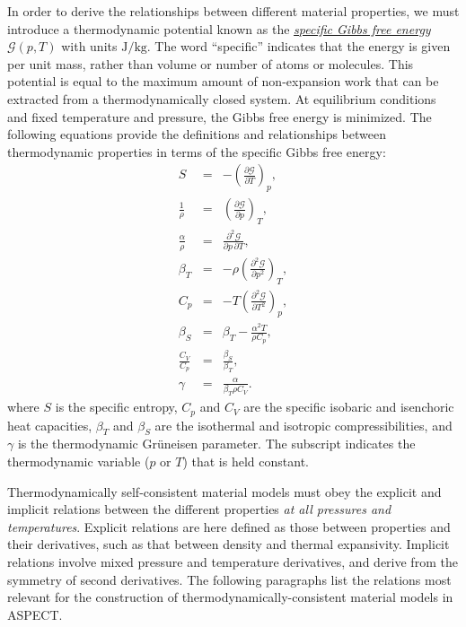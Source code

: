 \documentclass{article}
\newcommand{\aspect}{\textsc{ASPECT}}
\begin{document}
In order to derive the relationships between different material properties, we must
introduce a thermodynamic potential known as the
\href{https://en.wikipedia.org/wiki/Gibbs_free_energy}{\textit{specific
    Gibbs free energy}}
$\mathcal{G}(p, T)$ with units $\text{J}/\text{kg}$. The word ``specific'' indicates that the energy is
given per unit mass, rather than volume or number of atoms or molecules. This potential is
equal to the maximum amount of non-expansion work that can be extracted from a
thermodynamically closed system. At equilibrium conditions and fixed temperature and
pressure, the Gibbs free energy is minimized. The following equations provide the
definitions and relationships between thermodynamic properties in terms of the specific
Gibbs free energy:
\begin{eqnarray}
  S &=& - \left( \frac{\partial \mathcal{G}}{\partial T} \right)_{p}, \\
  \frac{1}{\rho} &=& \left( \frac{\partial \mathcal{G}}{\partial p} \right)_{T}, \label{eq:mm_density} \\
  \frac{\alpha}{\rho} &=& \frac{\partial^2 \mathcal{G}}{\partial {p} \, \partial {T}}, \label{eq:mm_alpha_g} \\
  \beta_T &=& -\rho \left( \frac{\partial^2 \mathcal{G}}{\partial {p}^2}  \right)_{T}, \label{eq:mm_betaT_g} \\
  C_p &=& -T \left( \frac{\partial^2 \mathcal{G}}{\partial {T}^2}  \right)_{p}, \label{eq:mm_isobaric_heat_capacity} \\
  \beta_S &=& \beta_T - \frac{\alpha^2 T}{\rho C_p}, \label{eq:mm_isentropic_compressibility} \\
  \frac{C_V}{C_p} &=& \frac{\beta_S}{\beta_T}, \\
  \gamma &=& \frac{\alpha }{\beta_T \rho C_V}. 
\end{eqnarray}
where $S$ is the specific entropy, $C_p$ and $C_V$ are the specific isobaric
and isenchoric heat capacities, $\beta_T$ and $\beta_S$ are the isothermal and isotropic
compressibilities, and $\gamma$ is the thermodynamic Gr\"{u}neisen parameter. The subscript
indicates the thermodynamic variable ($p$ or $T$) that is held constant.

Thermodynamically self-consistent material models must obey the explicit and implicit relations
between the different properties \emph{at all pressures and temperatures}. Explicit relations
are here defined as those between properties and their derivatives, such as that between
density and thermal expansivity. Implicit relations involve mixed pressure and temperature
derivatives, and derive from the symmetry of second derivatives. The following paragraphs
list the relations most relevant for the construction of thermodynamically-consistent material
models in \aspect{}.
\end{document}
